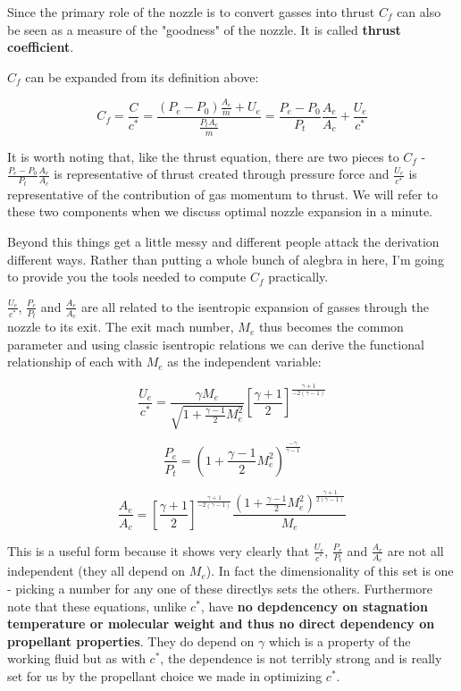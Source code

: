 \documentclass[twocolumn]{memoir} %
\begin{document}
Since the primary role of the nozzle is to convert gasses into thrust
\(C_f\) can also be seen as a measure of the "goodness" of the nozzle.
It is called \textbf{thrust coefficient}.

\(C_f\) can be expanded from its definition above:

\begin{equation}C_f = \frac{C}{c^*} = \frac{(P_e - P_0)\frac{A_e}{\dot{m}} + U_e}{\frac{P_t A_c}{\dot{m}}} = \frac{P_e - P_0}{P_t}\frac{A_e}{A_c} + \frac{U_e}{c^*}
\end{equation}

It is worth noting that, like the thrust equation, there are two pieces
to \(C_f\) - \(\frac{P_e - P_0}{P_t}\frac{A_e}{A_c}\) is representative
of thrust created through pressure force and \(\frac{U_e}{c^*}\) is
representative of the contribution of gas momentum to thrust. We will
refer to these two components when we discuss optimal nozzle expansion
in a minute.

Beyond this things get a little messy and different people attack the
derivation different ways. Rather than putting a whole bunch of alegbra
in here, I'm going to provide you the tools needed to compute \(C_f\)
practically.

\(\frac{U_e}{c^*}\), \(\frac{P_e}{P_t}\) and \(\frac{A_e}{A_c}\) are all
related to the isentropic expansion of gasses through the nozzle to its
exit. The exit mach number, \(M_e\) thus becomes the common parameter
and using classic isentropic relations we can derive the functional
relationship of each with \(M_e\) as the independent variable:

\begin{equation}\frac{U_e}{c^*} = \frac{\gamma M_e}{\sqrt{1 + \frac{\gamma - 1}{2}M_e^2}}\left[\frac{\gamma + 1}{2}\right]^{\frac{\gamma + 1}{-2(\gamma-1)}}
\end{equation}

\begin{equation}\frac{P_e}{P_t} = \left(1 + \frac{\gamma - 1}{2}M_e^2\right)^{\frac{-\gamma}{\gamma-1}}
\end{equation}

\begin{equation}\frac{A_e}{A_c} = \left[\frac{\gamma + 1}{2}\right]^{\frac{\gamma + 1}{-2(\gamma - 1)}} \frac{\left(1 + \frac{\gamma-1}{2}M_e^2 \right)^{\frac{\gamma + 1}{2(\gamma - 1)}}}{M_e}
\end{equation}

This is a useful form because it shows very clearly that
\(\frac{U_e}{c^*}\), \(\frac{P_e}{P_t}\) and \(\frac{A_e}{A_c}\) are not
all independent (they all depend on \(M_e\)). In fact the dimensionality
of this set is one - picking a number for any one of these directlys
sets the others. Furthermore note that these equations, unlike \(c^*\),
have \textbf{no depdencency on stagnation temperature or molecular weight and
thus no direct dependency on propellant properties}. They do depend on
\(\gamma\) which is a property of the working fluid but as with \(c^*\),
the dependence is not terribly strong and is really set for us by the
propellant choice we made in optimizing \(c^*\).
\end{document}
